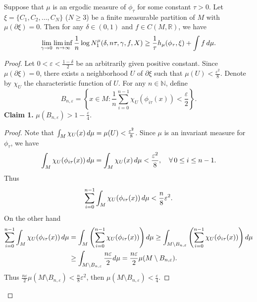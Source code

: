 \documentclass[10pt,a4paper]{amsart}
\begin{document}
\begin{Lemma}\label{lemma4.6}
Suppose that $\mu$ is an ergodic measure of \( \phi_\tau \) for some constant $\tau>0$. Let \( \xi = \{ C_1, C_2, \ldots, C_N \} \) (\( N \geq 3 \)) be a finite measurable partition of \( M \) with \( \mu(\partial \xi) = 0 \). Then for any \( \delta \in (0, 1) \) and \( f \in C(M, \mathbb{R}) \), we have
\[
\lim_{\gamma \to 0} \liminf_{n \to \infty} \frac{1}{n} \log N_1^\mu(\delta, n\tau, \gamma, f, X) \geq \frac{1}{\tau} h_\mu(\phi_\tau, \xi) + \int f \, {\rm d}\mu .
\]
\end{Lemma}

\begin{proof}
Let \( 0 < \varepsilon < \frac{1 - \delta}{2} \) be an arbitrarily given positive constant. Since \( \mu(\partial \xi) = 0 \), there exists a neighborhood \( U \) of \( \partial \xi \) such that \( \mu(U) < \frac{\varepsilon^2}{8} \). Denote by \( \chi_U \) the characteristic function of \( U \). For any \( n \in \mathbb{N} \), define
\[
B_{n, \varepsilon} = \left\{ x \in M : \frac{1}{n} \sum_{i=0}^{n-1} \chi_U(\phi_{i\tau}(x)) < \frac{\varepsilon }{2} \right\}.
\]
\noindent
\textbf{Claim 1. } \(\mu(B_{n, \varepsilon}) > 1 - \frac{\varepsilon}{4} \).

\bigskip


\noindent
\begin{proof} Note that \( \int_M \chi_U(x) \, {\rm d}\mu = \mu(U) < \frac{\varepsilon^2}{8} \). Since \( \mu \) is an invariant measure for \( \phi_\tau \), we have
\[
\int_M \chi_U ( \phi_{i\tau }(x)) \, {\rm d}\mu = \int_M \chi_U(x) \, {\rm d}\mu < \frac{\varepsilon^2}{8}, \quad \forall\, 0 \leq i \leq n-1.
\]
Thus
\[
\sum_{i=0}^{n-1} \int_M \chi_U( \phi_{i\tau }(x)) \, {\rm d}\mu < \frac{n }{8}\varepsilon^2.
\]
On the other hand
\begin{align*}
\sum_{i=0}^{n-1} \int_M \chi_U ( \phi_{i\tau }(x)) \, {\rm d}\mu &= \int_M \left( \sum_{i=0}^{n-1} \chi_U(\phi_{i\tau }(x)) \right) {\rm d}\mu\geq \int_{M \setminus B_{n, \varepsilon}} \left( \sum_{i=0}^{n-1} \chi_U(\phi_{i\tau }(x)) \right) {\rm d}\mu \\&\geq\int_{M \setminus B_{n, \varepsilon}} \frac{n\varepsilon}{2}{\rm d}\mu= \frac{n \varepsilon}{2} \mu(M \setminus B_{n, \varepsilon}).
\end{align*}
\noindent
Thus \( \frac{n\varepsilon}{2} \mu(M \setminus B_{n, \varepsilon}) < \frac{n}{8} \varepsilon^2 \), then \( \mu(M \setminus B_{n, \varepsilon}) < \frac{\varepsilon}{4} \).
\end{proof}


\end{proof}
\end{document}
